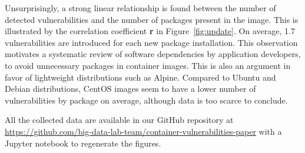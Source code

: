 Unsurprisingly, a strong linear relationship is found between the number of
detected vulnerabilities and the number of packages present in the
image. This is illustrated by the correlation coefficient \textbf{r} in Figure~\ref{fig:update}. On average, 1.7 vulnerabilities are introduced for
each new package installation. This observation motivates a systematic
review of software dependencies by application developers, to avoid
unnecessary packages in container images. This is also an argument in favor of lightweight
distributions such as Alpine. Compared to Ubuntu and Debian distributions,
CentOS images seem to have a lower number of vulnerabilities by package on
average, although data is too scarce to conclude.

All the collected
data are available in our GitHub repository at
\url{https://github.com/big-data-lab-team/container-vulnerabilities-paper}
with a Jupyter notebook to regenerate the figures.

